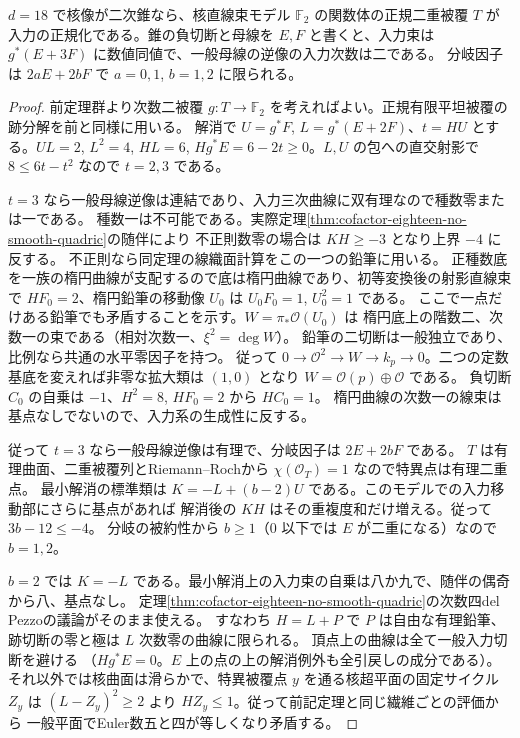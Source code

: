\begin{theorem}\label{thm:cofactor-eighteen-cone-ruling-degree}
$d=18$ で核像が二次錐なら、核直線束モデル $\mathbb F_2$ の関数体の正規二重被覆 $T$ が
入力の正規化である。錐の負切断と母線を $E,F$ と書くと、入力束は
$g^*(E+3F)$ に数値同値で、一般母線の逆像の入力次数は二である。
分岐因子は $2aE+2bF$ で $a=0,1$, $b=1,2$ に限られる。
\end{theorem}
\begin{proof}
前定理群より次数二被覆 $g:T\to\mathbb F_2$ を考えればよい。正規有限平坦被覆の跡分解を前と同様に用いる。
解消で $U=g^*F$, $L=g^*(E+2F)$、$t=HU$ とする。$UL=2$, $L^2=4$, $HL=6$,
$H g^*E=6-2t\ge0$。$L,U$ の包への直交射影で $8\le6t-t^2$ なので $t=2,3$ である。

$t=3$ なら一般母線逆像は連結であり、入力三次曲線に双有理なので種数零または一である。
種数一は不可能である。実際定理\ref{thm:cofactor-eighteen-no-smooth-quadric}の随伴により
不正則数零の場合は $KH\ge-3$ となり上界 $-4$ に反する。
不正則なら同定理の線織面計算をこの一つの鉛筆に用いる。
正種数底を一族の楕円曲線が支配するので底は楕円曲線であり、初等変換後の射影直線束で
$HF_0=2$、楕円鉛筆の移動像 $U_0$ は $U_0 F_0=1$, $U_0^2=1$ である。
ここで一点だけある鉛筆でも矛盾することを示す。$W=\pi_*\mathcal O(U_0)$ は
楕円底上の階数二、次数一の束である（相対次数一、$\xi^2=\deg W$）。
鉛筆の二切断は一般独立であり、比例なら共通の水平零因子を持つ。
従って $0\to\mathcal O^2\to W\to k_p\to0$。二つの定数基底を変えれば非零な拡大類は
$(1,0)$ となり $W=\mathcal O(p)\oplus\mathcal O$ である。
負切断 $C_0$ の自乗は $-1$、$H^2=8$, $HF_0=2$ から $HC_0=1$。
楕円曲線の次数一の線束は基点なしでないので、入力系の生成性に反する。

従って $t=3$ なら一般母線逆像は有理で、分岐因子は $2E+2bF$ である。
$T$ は有理曲面、二重被覆列とRiemann--Rochから $\chi(\mathcal O_T)=1$ なので特異点は有理二重点。
最小解消の標準類は $K=-L+(b-2)U$ である。このモデルでの入力移動部にさらに基点があれば
解消後の $KH$ はその重複度和だけ増える。従って $3b-12\le-4$。
分岐の被約性から $b\ge1$（$0$ 以下では $E$ が二重になる）なので $b=1,2$。

$b=2$ では $K=-L$ である。最小解消上の入力束の自乗は八か九で、随伴の偶奇から八、基点なし。
定理\ref{thm:cofactor-eighteen-no-smooth-quadric}の次数四del Pezzoの議論がそのまま使える。
すなわち $H=L+P$ で $P$ は自由な有理鉛筆、跡切断の零と極は $L$ 次数零の曲線に限られる。
頂点上の曲線は全て一般入力切断を避ける
（$Hg^*E=0$。$E$ 上の点の上の解消例外も全引戻しの成分である）。
それ以外では核曲面は滑らかで、特異被覆点 $y$ を通る核超平面の固定サイクル $Z_y$ は
$(L-Z_y)^2\ge2$ より $HZ_y\le1$。従って前記定理と同じ繊維ごとの評価から
一般平面でEuler数五と四が等しくなり矛盾する。


\end{proof}
